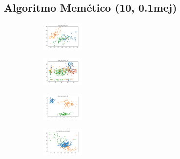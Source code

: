 \vspace*{\fill}
\newpage


\subsection{Algoritmo Memético (10, 0.1mej)}

\begin{figure}[H]    
    \centering
    \begin{subfigure}
        \centering
        \includegraphics[width=0.234\textwidth]{img/am01mej/iris_set_const_10_949004259_clust.png}
    \end{subfigure}
    \hfill
    \begin{subfigure}
        \centering
        \includegraphics[width=0.234\textwidth]{img/am01mej/ecoli_set_const_10_949004259_clust.png}
    \end{subfigure}
    \hfill
    \begin{subfigure}
        \centering
        \includegraphics[width=0.234\textwidth]{img/am01mej/rand_set_const_10_949004259_clust.png}
    \end{subfigure}
    \hfill
    \begin{subfigure}
        \centering
        \includegraphics[width=0.234\textwidth]{img/am01mej/newthyroid_set_const_10_949004259_clust.png}

\end{subfigure}
\end{figure}
